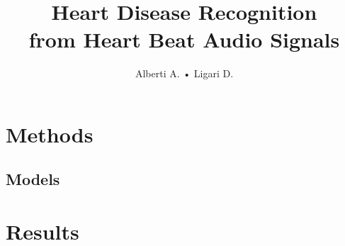 \documentclass[twocolumn]{class}
\title{Heart Disease Recognition \\ from Heart Beat Audio Signals}
\author{Alberti A. • Ligari D.}
\begin{document}
\maketitle
\pagestyle{FirstPage}

\tableofcontents




\pagestyle{OtherPage}

\section{Methods}




\subsection{Models} %







\section{Results}







\clearpage


\clearpage
\printbibliography
\end{document}
